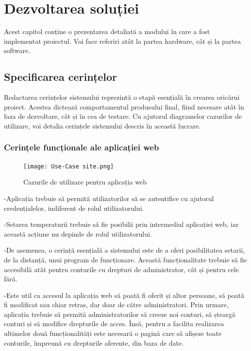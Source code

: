 \chapter{Dezvoltarea soluției}\label{ch:4dezvoltareaSolutiei}

	Acest capitol conține o prezentarea detaliată a modului în care a fost implementat proiectul. Voi face referiri atât la partea hardware, cât și la partea software. 

\section{Specificarea cerințelor}
	
	Redactarea cerințelor sistemului reprezintă o etapă esențială în crearea oricărui proiect. Acestea dictează comportamentul produsului final, fiind necesare atât în faza de dezvoltare, cât și în cea de testare. Cu ajutorul diagramelor cazurilor de utilizare, voi detalia cerințele sistemului descris în această lucrare.

\subsection{Cerințele funcționale ale aplicației web}

\begin{figure}[H]
   	\centering
    	\texttt{[image: Use-Case site.png]}
	\caption{Cazurile de utilizare pentru aplicația web}
\end{figure}
	
	-Aplicația trebuie să permită utilizatorilor să se autentifice cu ajutorul credențialelor, indiferent de rolul utilizatorului.

	-Setarea temperaturii trebuie să fie posibilă prin intermediul aplicației web, iar această acțiune nu depinde de rolul utilizatorului.

	-De asemenea, o cerință esențială a sistemului este de a oferi posibilitatea setarii, de la distanță, unui program de funcționare. Această funcționalitate trebuie să fie accesibilă atât pentru conturile cu drepturi de administrator, cât și pentru cele fără.

	-Este util ca accesul la aplicația web să poată fi oferit și altor persoane, să poată fi modificat sau chiar retras, dar doar de către administratori. Prin urmare, aplicația trebuie să permită administratorilor să creeze noi conturi, să șteargă conturi și să modifice drepturile de acces. Însă, pentru a facilita realizarea ultimelor două funcționalități este necesară o pagină care să afișeze toate conturile, împreună cu drepturile aferente, din baza de date. 

